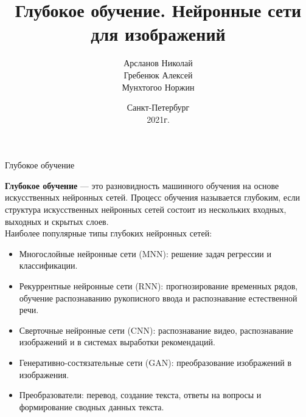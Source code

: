 \documentclass[unicode,9pt, pdf]{beamer}
\title[Глубокое обучение. Нейронные сети для изображений]{Глубокое обучение. Нейронные сети для изображений}
\author[Арсланов Н., Гребенюк А., Мунхтогоо Н.]{Арсланов Николай \\
        Гребенюк Алексей \\
        Мунхтогоо Норжин}
\date{
	Санкт-Петербург\\
	2021г.
}
\begin{document}
	
	\begin{frame}
		\titlepage
	\end{frame}
	
	\begin{frame}{Глубокое обучение}
	
    \textbf{Глубокое обучение} --- это разновидность машинного обучения на основе искусственных нейронных сетей. Процесс обучения называется глубоким, если структура искусственных нейронных сетей состоит из нескольких входных, выходных и скрытых слоев. \\
    \vspace{0.5cm}
	Наиболее популярные типы глубоких нейронных сетей:
        \begin{itemize}
            \item Многослойные нейронные сети (MNN): решение задач регрессии и классификации.
            \item Рекуррентные нейронные сети (RNN): прогнозирование временных рядов, обучение распознаванию рукописного ввода и распознавание естественной речи.
            \item  Сверточные нейронные сети (CNN): распознавание видео, распознавание изображений и в системах выработки рекомендаций.
            \item Генеративно-состязательные сети (GAN): преобразование изображений в изображения.
            \item Преобразователи: перевод, создание текста, ответы на вопросы и формирование сводных данных текста.
        \end{itemize}
    \vspace{0.5cm}
        
	\end{frame}
	
\end{document}
